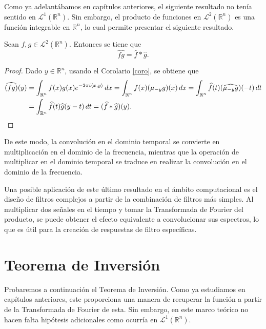 \noindent Como ya adelantábamos en capítulos anteriores, el siguiente resultado no tenía sentido en $\mathscr{L}^1(\mathbb{R}^n)$. Sin embargo, el producto de funciones en  $\mathscr{L}^2(\mathbb{R}^n)$ es una función integrable en $\mathbb{R}^n$, lo cual permite presentar el siguiente resultado.

\begin{teorema}Sean $f,g \in \mathscr{L}^2(\mathbb{R}^n)$. Entonces se tiene que 
\begin{equation}
    \widehat{fg} = \widehat{f}*\widehat{g}.
\end{equation}
\end{teorema}

\begin{proof}
Dado $y \in \mathbb{R}^n$, usando el Corolario \ref{coro}, se obtiene que 
\begin{equation*}
\begin{aligned}
\widehat{(fg)}(y) & = \int_{\mathbb{R}^n} f(x)g(x) e^{-2 \pi i \langle x, y \rangle} \, dx 
 = \int_{\mathbb{R}^n} f(x)(\mu_{-y}g)(x) \, dx = \int_{\mathbb{R}^n} \widehat{f}(t)(\widehat{\mu_{-y}g})(-t) \, dt \\
& = \int_{\mathbb{R}^n} \widehat{f}(t)\widehat{g}(y-t)\,dt = (\widehat{f}*\widehat{g})(y).
\end{aligned}\qedhere
\end{equation*}
\end{proof}

\vspace{0.2cm}
\noindent 
De este modo, la convolución en el dominio temporal se convierte en multiplicación en el dominio de la frecuencia, mientras que la operación de multiplicar en el dominio temporal se traduce en realizar la convolución en el dominio de la frecuencia. 


\noindent Una posible aplicación de este último resultado en el ámbito computacional es el diseño de filtros complejos a partir de la combinación de filtros más simples. Al multiplicar dos señales en el tiempo y tomar la Transformada de Fourier del producto, se puede obtener el efecto equivalente a convolucionar sus espectros, lo que es útil para la creación de respuestas de filtro específicas.




\section{Teorema de Inversión}

Probaremos a continuación el Teorema de Inversión. Como ya estudiamos en capítulos anteriores, este proporciona una manera de recuperar la función a partir de la Transformada de Fourier de esta. Sin embargo, en este marco teórico no hacen falta hipótesis adicionales como ocurría en  $\mathscr{L}^1(\mathbb{R}^n)$.

